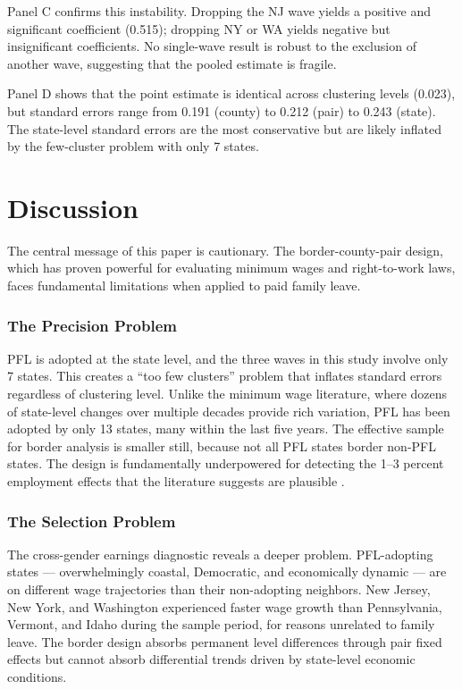 \documentclass[12pt]{article}
\begin{document}
Panel C confirms this instability. Dropping the NJ wave yields a positive and significant coefficient (0.515); dropping NY or WA yields negative but insignificant coefficients. No single-wave result is robust to the exclusion of another wave, suggesting that the pooled estimate is fragile.

Panel D shows that the point estimate is identical across clustering levels (0.023), but standard errors range from 0.191 (county) to 0.212 (pair) to 0.243 (state). The state-level standard errors are the most conservative but are likely inflated by the few-cluster problem with only 7 states.


\section{Discussion}

The central message of this paper is cautionary. The border-county-pair design, which has proven powerful for evaluating minimum wages and right-to-work laws, faces fundamental limitations when applied to paid family leave.

\subsubsection*{The Precision Problem} PFL is adopted at the state level, and the three waves in this study involve only 7 states. This creates a ``too few clusters'' problem that inflates standard errors regardless of clustering level. Unlike the minimum wage literature, where dozens of state-level changes over multiple decades provide rich variation, PFL has been adopted by only 13 states, many within the last five years. The effective sample for border analysis is smaller still, because not all PFL states border non-PFL states. The design is fundamentally underpowered for detecting the 1--3 percent employment effects that the literature suggests are plausible \citep{rossin-slater_effects_2013, bailey_paid_2023}.

\subsubsection*{The Selection Problem} The cross-gender earnings diagnostic reveals a deeper problem. PFL-adopting states --- overwhelmingly coastal, Democratic, and economically dynamic --- are on different wage trajectories than their non-adopting neighbors. New Jersey, New York, and Washington experienced faster wage growth than Pennsylvania, Vermont, and Idaho during the sample period, for reasons unrelated to family leave. The border design absorbs permanent level differences through pair fixed effects but cannot absorb differential trends driven by state-level economic conditions.
\end{document}

